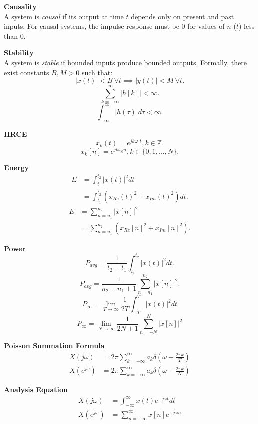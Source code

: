 \documentclass{article}
\begin{document}
\begin{multicols}{2}
    \noindent\textbf{Causality}\\
    A system is \emph{causal} if its output at time \( t \) depends
    only on present and past inputs.
    For causal systems, the impulse response must be 0 for values of $n$ ($t$)
    less than 0.

    \noindent\textbf{Stability}\\
    A system is \emph{stable} if bounded inputs produce
    bounded outputs. Formally, there exist constants \( B, M > 0 \)
    such that:
    \[
        |x(t)| < B \ \forall t \implies |y(t)| < M \ \forall t.
    \]
    \[
        \sum_{k=-\infty}^{\infty} |h[k]| < \infty.
    \]
    \[
        \int_{-\infty}^{\infty} |h(\tau)| d\tau < \infty.
    \]

    \noindent\textbf{HRCE}
    \[
        x_k(t) = e^{jk\omega_0 t}, k \in \mathbb{Z}.
    \]
    \[
        x_k[n] = e^{jk\omega_0 n}, k \in \{0, 1, ..., N\}.
    \]

    \noindent\textbf{Energy}
    \begin{align*}
        E & = \int_{t_1}^{t_2} |x(t)|^2 dt                     \\
          & = \int_{t_1}^{t_2} (x_{Re}(t)^2 + x_{Im}(t)^2) dt.
    \end{align*}
    \begin{align*}
        E & = \sum_{n=n_1}^{n_2} |x[n]|^2                     \\
          & = \sum_{n=n_1}^{n_2} (x_{Re}[n]^2 + x_{Im}[n]^2).
    \end{align*}

    \noindent\textbf{Power}
    \[
        P_{avg} = \frac{1}{t_2 - t_1} \int_{t_1}^{t_2} |x(t)|^2 dt.
    \]
    \[
        P_{avg} = \frac{1}{n_2 - n_1 + 1} \sum_{n=n_1}^{n_2} |x[n]|^2.
    \]
    \[
        P_{\infty} = \lim_{T \rightarrow \infty} \frac{1}{2T} \int_{-T}^{T} |x(t)|^2 dt
    \]
    \[
        P_{\infty} = \lim_{N \rightarrow \infty} \frac{1}{2N + 1} \sum_{n=-N}^{N} |x[n]|^2
    \]

    \noindent\textbf{Poisson Summation Formula}
    \begin{align*}
        X(j\omega)     & = 2\pi\sum_{k=-\infty}^{\infty} a_k \delta\left( \omega - \frac{2\pi k}{T} \right) \\
        X(e^{j\omega}) & = 2\pi\sum_{k=-\infty}^{\infty} a_k \delta\left( \omega - \frac{2\pi k}{N} \right)
    \end{align*}

    \noindent\textbf{Analysis Equation}
    \begin{align*}
        X(j\omega)     & = \int_{-\infty}^{\infty} x(t) e^{-j\omega t} dt \\
        X(e^{j\omega}) & = \sum_{n=-\infty}^{\infty} x[n] e^{-j\omega n}
    \end{align*}


\end{multicols}
\end{document}
